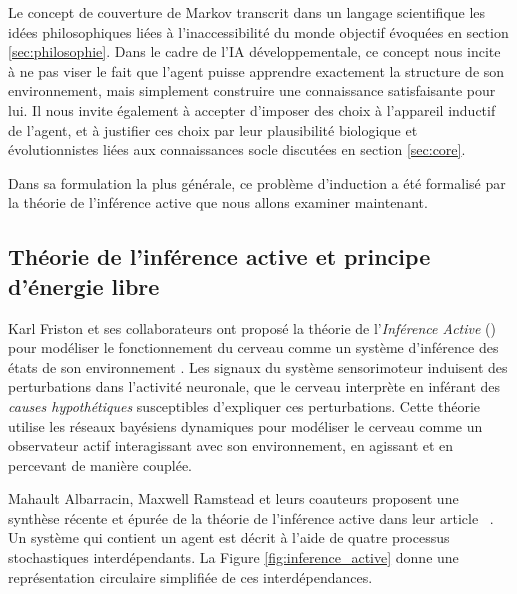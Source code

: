 

Le concept de couverture de Markov transcrit dans un langage scientifique les idées philosophiques liées à l'inaccessibilité du monde objectif évoquées en section \ref{sec:philosophie}.
Dans le cadre de l'IA développementale, ce concept nous incite à ne pas viser le fait que l'agent puisse apprendre exactement la structure de son environnement, mais simplement construire une connaissance satisfaisante pour lui. 
Il nous invite également à accepter d'imposer des choix à l'appareil inductif de l'agent, et à justifier ces choix par leur plausibilité biologique et évolutionnistes liées aux connaissances socle discutées en section \ref{sec:core}.

Dans sa formulation la plus générale, ce problème d'induction a été formalisé par la théorie de l'inférence active que nous allons examiner maintenant.


\subsection{Théorie de l'inférence active et principe d'énergie libre}
\label{sec:active_inference}

\noindent
Karl Friston et ses collaborateurs ont proposé la théorie de l'\emph{Inférence Active} () pour modéliser le fonctionnement du cerveau comme un système d'inférence des états de son  environnement \cite{friston_active_2017}. 
Les signaux du système sensorimoteur induisent des perturbations dans l'activité neuronale, que le cerveau interprète en inférant des \emph{causes hypothétiques} susceptibles d'expliquer ces perturbations.
Cette théorie utilise les réseaux bayésiens dynamiques pour modéliser le cerveau comme un observateur actif interagissant avec son environnement, en agissant et en percevant de manière couplée. 


Mahault Albarracin, Maxwell Ramstead et leurs coauteurs proposent une synthèse récente et épurée de la théorie de l'inférence active dans leur article \og {} \fg\ \cite{albarracin_sustainability_2024}.
Un système qui contient un agent est décrit à l'aide de quatre processus stochastiques interdépendants.
La Figure \ref{fig:inference_active} donne une représentation circulaire simplifiée de ces interdépendances.  

